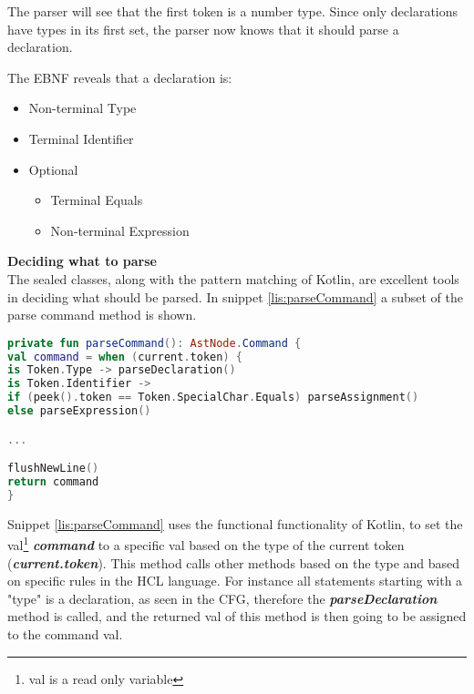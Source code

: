 The parser will see that the first token is a number type. 
Since only declarations have types in its first set, the parser now knows that it should parse a declaration.

The EBNF reveals that a declaration is:
\begin{itemize}
	\item Non-terminal Type
	\item Terminal Identifier
	\item Optional
	\begin{itemize}
		\item Terminal Equals
		\item Non-terminal Expression
	\end{itemize}
\end{itemize}
\textbf{Deciding what to parse}\\
The sealed classes, along with the pattern matching of Kotlin, are excellent tools in deciding what should be parsed. 
In snippet \ref{lis:parseCommand} a subset of the parse command method is shown. 

\begin{lstlisting}[language=Kotlin,label=lis:parseCommand,caption=A simplified version of the parse declaration method from the parser.]
private fun parseCommand(): AstNode.Command {
val command = when (current.token) {
is Token.Type -> parseDeclaration()
is Token.Identifier ->
if (peek().token == Token.SpecialChar.Equals) parseAssignment() 
else parseExpression()

...

flushNewLine()
return command
}
\end{lstlisting}
Snippet \ref{lis:parseCommand} uses the functional functionality of Kotlin, to set the val\footnote{val is a read only variable} \textit{\textbf{command}} to a specific val based on the type of the current token (\textit{\textbf{current.token}}). This method calls other methods based on the type and based on specific rules in the HCL language. For instance all statements starting with a "type" is a declaration, as seen in the CFG, therefore the \textit{\textbf{parseDeclaration}} method is called, and the returned val of this method is then going to be assigned to the command val.
	
